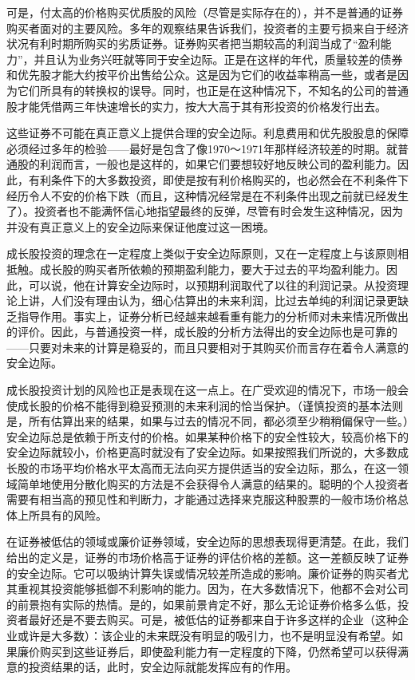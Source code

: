 \documentclass[12pt,oneside]{book}
\begin{document}
可是，付太高的价格购买优质股的风险（尽管是实际存在的），并不是普通的证券购买者面对的主要风险。多年的观察结果告诉我们，投资者的主要亏损来自于经济状况有利时期所购买的劣质证券。证券购买者把当期较高的利润当成了“盈利能力”，并且认为业务兴旺就等同于安全边际。正是在这样的年代，质量较差的债券和优先股才能大约按平价出售给公众。这是因为它们的收益率稍高一些，或者是因为它们所具有的转换权的误导。同时，也正是在这种情况下，不知名的公司的普通股才能凭借两三年快速增长的实力，按大大高于其有形投资的价格发行出去。

这些证券不可能在真正意义上提供合理的安全边际。利息费用和优先股股息的保障必须经过多年的检验——最好是包含了像1970～1971年那样经济较差的时期。就普通股的利润而言，一般也是这样的，如果它们要想较好地反映公司的盈利能力。因此，有利条件下的大多数投资，即使是按有利价格购买的，也必然会在不利条件下经历令人不安的价格下跌（而且，这种情况经常是在不利条件出现之前就已经发生了）。投资者也不能满怀信心地指望最终的反弹，尽管有时会发生这种情况，因为并没有真正意义上的安全边际来保证他度过这一困境。

成长股投资的理念在一定程度上类似于安全边际原则，又在一定程度上与该原则相抵触。成长股的购买者所依赖的预期盈利能力，要大于过去的平均盈利能力。因此，可以说，他在计算安全边际时，以预期利润取代了以往的利润记录。从投资理论上讲，人们没有理由认为，细心估算出的未来利润，比过去单纯的利润记录更缺乏指导作用。事实上，证券分析已经越来越看重有能力的分析师对未来情况所做出的评价。因此，与普通投资一样，成长股的分析方法得出的安全边际也是可靠的——只要对未来的计算是稳妥的，而且只要相对于其购买价而言存在着令人满意的安全边际。

成长股投资计划的风险也正是表现在这一点上。在广受欢迎的情况下，市场一般会使成长股的价格不能得到稳妥预测的未来利润的恰当保护。（谨慎投资的基本法则是，所有估算出来的结果，如果与过去的情况不同，都必须至少稍稍偏保守一些。）安全边际总是依赖于所支付的价格。如果某种价格下的安全性较大，较高价格下的安全边际就较小，价格更高时就没有了安全边际。如果按照我们所说的，大多数成长股的市场平均价格水平太高而无法向买方提供适当的安全边际，那么，在这一领域简单地使用分散化购买的方法是不会获得令人满意的结果的。聪明的个人投资者需要有相当高的预见性和判断力，才能通过选择来克服这种股票的一般市场价格总体上所具有的风险。

在证券被低估的领域或廉价证券领域，安全边际的思想表现得更清楚。在此，我们给出的定义是，证券的市场价格高于证券的评估价格的差额。这一差额反映了证券的安全边际。它可以吸纳计算失误或情况较差所造成的影响。廉价证券的购买者尤其重视其投资能够抵御不利影响的能力。因为，在大多数情况下，他都不会对公司的前景抱有实际的热情。是的，如果前景肯定不好，那么无论证券价格多么低，投资者最好还是不要去购买。可是，被低估的证券都来自于许多这样的企业（这种企业或许是大多数）：该企业的未来既没有明显的吸引力，也不是明显没有希望。如果廉价购买到这些证券后，即使盈利能力有一定程度的下降，仍然希望可以获得满意的投资结果的话，此时，安全边际就能发挥应有的作用。
\end{document}
